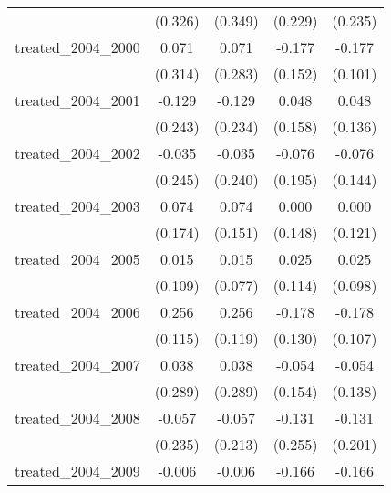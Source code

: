 {\begin{tabular}{l*{4}{c}}
            &     (0.326)         &     (0.349)         &     (0.229)         &     (0.235)         \\
[1em]
treated\_2004\_2000&       0.071         &       0.071         &      -0.177         &      -0.177         \\
            &     (0.314)         &     (0.283)         &     (0.152)         &     (0.101)         \\
[1em]
treated\_2004\_2001&      -0.129         &      -0.129         &       0.048         &       0.048         \\
            &     (0.243)         &     (0.234)         &     (0.158)         &     (0.136)         \\
[1em]
treated\_2004\_2002&      -0.035         &      -0.035         &      -0.076         &      -0.076         \\
            &     (0.245)         &     (0.240)         &     (0.195)         &     (0.144)         \\
[1em]
treated\_2004\_2003&       0.074         &       0.074         &       0.000         &       0.000         \\
            &     (0.174)         &     (0.151)         &     (0.148)         &     (0.121)         \\
[1em]
treated\_2004\_2005&       0.015         &       0.015         &       0.025         &       0.025         \\
            &     (0.109)         &     (0.077)         &     (0.114)         &     (0.098)         \\
[1em]
treated\_2004\_2006&       0.256\sym{*}  &       0.256\sym{*}  &      -0.178         &      -0.178         \\
            &     (0.115)         &     (0.119)         &     (0.130)         &     (0.107)         \\
[1em]
treated\_2004\_2007&       0.038         &       0.038         &      -0.054         &      -0.054         \\
            &     (0.289)         &     (0.289)         &     (0.154)         &     (0.138)         \\
[1em]
treated\_2004\_2008&      -0.057         &      -0.057         &      -0.131         &      -0.131         \\
            &     (0.235)         &     (0.213)         &     (0.255)         &     (0.201)         \\
[1em]
treated\_2004\_2009&      -0.006         &      -0.006         &      -0.166         &      -0.166         \\

\end{tabular}}
